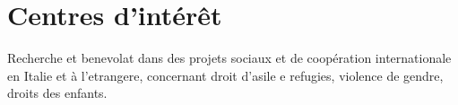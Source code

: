 \documentclass[a4paper,10pt]{article}
\begin{document}
\section{Centres d'intérêt}
Recherche et benevolat dans des projets sociaux et de coopération internationale en Italie et à  l'etrangere, concernant droit d'asile e refugies, violence de gendre, droits des enfants.
\end{document}
